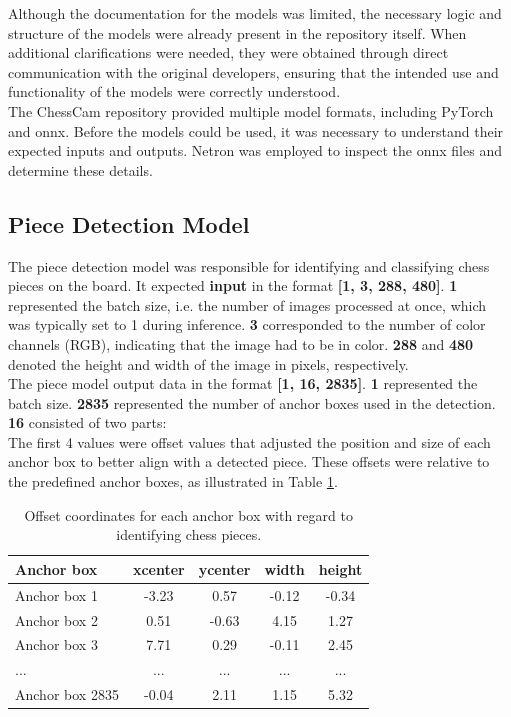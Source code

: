 Although the documentation for the models was limited, the necessary logic and structure of the models were already present in the repository itself. When additional clarifications were needed, they were obtained through direct communication with the original developers, ensuring that the intended use and functionality of the models were correctly understood. \\

The ChessCam repository provided multiple model formats, including PyTorch and \gls{onnx}. Before the models could be used, it was necessary to understand their expected inputs and outputs. Netron was employed to inspect the \gls{onnx} files and determine these details. \\


\subsection{Piece Detection Model}
The piece detection model was responsible for identifying and classifying chess pieces on the board. It expected \textbf{input} in the format \textbf{[1, 3, 288, 480]}. \textbf{1} represented the batch size, i.e. the number of images processed at once, which was typically set to 1 during inference. \textbf{3} corresponded to the number of color channels (RGB), indicating that the image had to be in color. \textbf{288} and \textbf{480} denoted the height and width of the image in pixels, respectively. \\

The piece model output data in the format \textbf{[1, 16, 2835]}. \textbf{1} represented the batch size. \textbf{2835} represented the number of anchor boxes used in the detection. \textbf{16} consisted of two parts: \\

The first 4 values were offset values that adjusted the position and size of each anchor box to better align with a detected piece. These offsets were relative to the predefined anchor boxes, as illustrated in Table \ref{tab:piece-offset-table}.

\begin{table}[h]
    \centering
    \caption{Offset coordinates for each anchor box with regard to identifying chess pieces.}  %
    \renewcommand{\arraystretch}{1.5} %
    \begin{tabular}{lcccc}
        \toprule
        \textbf{Anchor box} & \textbf{xcenter} & \textbf{ycenter} & \textbf{width} & \textbf{height} \\
        \midrule
        Anchor box 1 & -3.23 & 0.57 & -0.12 & -0.34 \\
        Anchor box 2 & 0.51 & -0.63 & 4.15 & 1.27 \\
        Anchor box 3 & 7.71 & 0.29 & -0.11 & 2.45 \\
        ... & ... & ... & ... & ... \\
        Anchor box 2835 & -0.04 & 2.11 & 1.15 & 5.32 \\
        \bottomrule
    \end{tabular}
    \label{tab:piece-offset-table}
\end{table}


